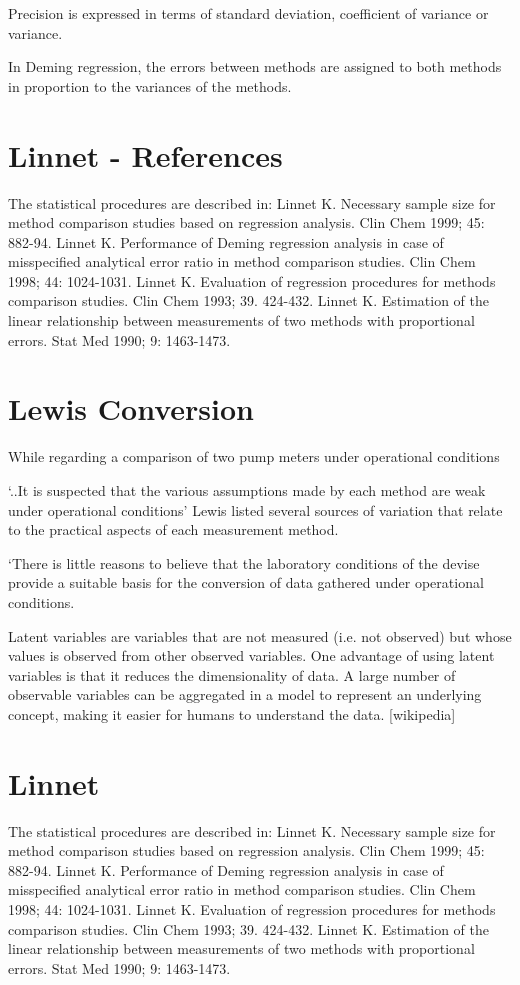 \documentclass[MAIN.tex]{subfiles}
\begin{document}
Precision is expressed in terms of standard deviation, coefficient of variance or variance.

In Deming regression, the errors between methods are assigned to both methods in proportion to the variances of the methods.

	\section{Linnet - References}
	The statistical procedures are described in:
	Linnet K. Necessary sample size for method comparison studies based on regression analysis. Clin Chem 1999; 45: 882-94.
	Linnet K. Performance of Deming regression analysis in case of misspecified analytical error ratio in method comparison studies. Clin Chem 1998; 44: 1024-1031.
	Linnet K. Evaluation of regression procedures for methods comparison studies. Clin Chem 1993; 39. 424-432.
	Linnet K. Estimation of the linear relationship between measurements of two methods with proportional errors. Stat Med 1990; 9: 1463-1473.
	
	
	\section{Lewis Conversion} 
	While regarding a comparison of two pump meters under operational conditions
	
	‘..It is suspected that the various assumptions made by each method are weak under operational conditions’
	Lewis listed several sources of variation that relate to the practical aspects of each measurement method.
	
	‘There is little reasons to believe that the laboratory conditions of the devise provide a suitable basis for the conversion of data gathered under operational conditions.
	
	
	Latent variables are variables that are not measured (i.e. not observed) but whose values is observed from other observed variables. One advantage of using latent variables is that it reduces the dimensionality of data. A large number of observable variables can be aggregated in a model to represent an underlying concept, making it easier for humans to understand the data.	[wikipedia]

\section*{Linnet}
The statistical procedures are described in:
Linnet K. Necessary sample size for method comparison studies based on regression analysis. Clin Chem 1999; 45: 882-94.
Linnet K. Performance of Deming regression analysis in case of misspecified analytical error ratio in method comparison studies. Clin Chem 1998; 44: 1024-1031.
Linnet K. Evaluation of regression procedures for methods comparison studies. Clin Chem 1993; 39. 424-432.
Linnet K. Estimation of the linear relationship between measurements of two methods with proportional errors. Stat Med 1990; 9: 1463-1473.




\end{document}
